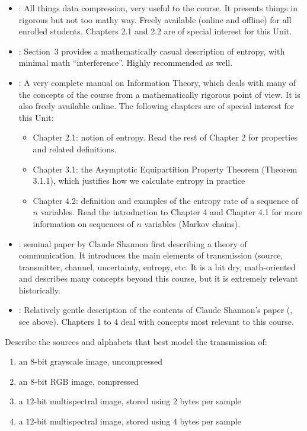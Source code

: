 \begin{itemize}
\item \cite{sayood_introduction}: All things data compression, very useful to the course.
It presents things in rigorous but not too mathy way. Freely available (online and offline) for all enrolled students.
Chapters 2.1 and 2.2 are of special interest for this Unit.

\item \cite[\S 3]{mcanlis_understanding}: Section~3 provides a mathematically casual description of
entropy, with minimal math ``interference''. Highly recommended as well.

\item \cite{cover_elements}: A very complete manual on Information Theory, which deals with many of the concepts of the course
from a mathematically rigorous point of view.
It is also freely available online. The following chapters are of special interest for this Unit:
\begin{itemize}
    \item Chapter 2.1: notion of entropy. Read the rest of Chapter 2 for properties and related definitions.
    \item Chapter 3.1: the Asymptotic Equipartition Property Theorem (Theorem 3.1.1), which justifies how we calculate entropy in practice
    \item Chapter 4.2: definition and examples of the entropy rate of a sequence of $n$ variables.
    Read the introduction to Chapter 4 and Chapter 4.1 for more information on sequences of $n$ variables (Markov chains).
\end{itemize}

\item \cite{shannon_communication}: seminal paper by Claude Shannon first describing a theory of communication.
It introduces the main elements of transmission (source, transmitter, channel, uncertainty, entropy, etc.
It is a bit dry, math-oriented and describes many concepts beyond this course, but it is extremely relevant historically.

\item \cite{stone_information}: Relatively gentle description of the contents of Claude Shannon's paper
(\cite{shannon_communication}, see above). Chapters 1 to 4 deal with concepts most relevant to this course.
\end{itemize}


\begin{exercise}
Describe the sources and alphabets that best model the transmission of:
\begin{enumerate}
\item an $8$-bit grayscale image, uncompressed
\item an $8$-bit RGB image, compressed
\item a $12$-bit multispectral image, stored using $2$ bytes per sample
\item a $12$-bit multispectral image, stored using $4$ bytes per sample
\end{enumerate}
\end{exercise}

